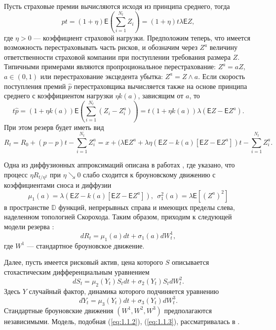 Пусть страховые премии вычисляются исходя из принципа среднего, тогда
$$ p t= (1+\eta)\mathsf E\left(\sum_{i=1}^{N_t} Z_i\right)=(1+\eta) t \lambda\mathsf E Z, $$
где $\eta>0$ --- коэффициент страховой нагрузки. Предположим теперь, что имеется возможность перестраховывать часть рисков, и обозначим через $Z^a$ величину ответственности страховой компании при поступлении требования размера $Z$. Типичными примерами являются пропроциональное перестрахование: $Z^a=a Z$, $a\in (0,1)$ или перестрахование эксцедента убытка: $Z^a=Z\wedge a$. Если скорость поступления премий $\widehat p$ перестраховщика вычисляется также на основе принципа среднего с коэффициентом нагрузки $\eta k(a)$, зависящим от $a$, то
$$ t\widehat p=(1+\eta k(a))\mathsf E\left(\sum_{i=1}^{N_t } (Z_i-Z_i^a)\right)=t(1+\eta k(a)) \lambda (\mathsf E Z-\mathsf E Z^a).$$
При этом резерв будет иметь вид
$$R_t=R_0+(p-\widehat p) t - \sum_{i=1}^{N_t } Z^a_i=x+(\lambda \mathsf E Z^a+\lambda\eta (\mathsf E Z-k(a)[\mathsf E Z-\mathsf E Z^a])t-\sum_{i=1}^{N_t} Z^a_i.$$

Одна из диффузионных аппроксимаций описана в работах \cite{AsmHojTak00, HogTak04}, где указано, что процесс $\eta R_{t/\eta^2}$ при $\eta\searrow 0$ слабо сходится к броуновскому движению с коэффициентами сноса и диффузии
$$ \mu_1(a)=\lambda (\mathsf E Z- k(a)[\mathsf E Z-\mathsf EZ^a]),\ \ \sigma_1^2(a)=\lambda\mathsf E\left[(Z^a)^2\right]$$
в пространстве $\mathbb D$ функций, непрерывных справа и имеющих пределы слева, наделенном топологией Скорохода. Таким образом, приходим к следующей модели резерва \cite{AsmHojTak00, HogTak04}:
\begin{equation} \label{eq:1.1.1}
d R_t=\mu_1(a) dt+\sigma_1 (a) dW^1_t,
\end{equation}
где $W^1$ --- стандартное броуновское движение.

Далее, пусть имеется рисковый актив, цена которого $S$ описывается стохастическим дифференциальным уравнением
\begin{equation} \label{eq:1.1.2}
dS_t= \mu_2 (Y_t) S_t dt +\sigma_2 (Y_t) S_t d W^2_t.
\end{equation}
Здесь $Y$ случайный фактор, динамика которого подчиняется уравнению
\begin{equation} \label{eq:1.1.3}
dY_t=\mu_3(Y_t)dt+\sigma_3 (Y_t) d W_t^3.
\end{equation}
Стандартные броуновские движения $(W^1,W^2,W^3)$ предполагаются независимыми. Модель, подобная (\ref{eq:1.1.2}), (\ref{eq:1.1.3}), рассматривалась в \cite{LiaYueGuo11}.


